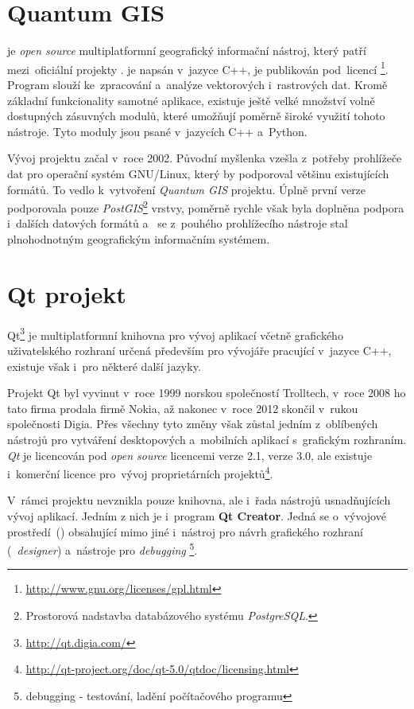 \section{Quantum GIS}
\label{qgis}

 je \textit{open source} multiplatformní geografický 
informační nástroj, který patří mezi~oficiální projekty .
 je napsán v~jazyce C++, je publikován pod~licencí 
\footnote{\url{http://www.gnu.org/licenses/gpl.html}}. 
Program slouží ke~zpracování a~analýze vektorových i~rastrových dat. 
Kromě základní funkcionality samotné aplikace, existuje ještě velké 
množství volně dostupných zásuvných modulů, které umožňují poměrně 
široké využití tohoto nástroje. Tyto moduly jsou psané v~jazycích 
C++ a~Python.

Vývoj projektu  začal v~roce 2002. Původní myšlenka vzešla z~potřeby 
prohlížeče  dat pro operační systém GNU/Linux, který by podporoval většinu 
existujících formátů. To vedlo k~vytvoření \textit{Quantum GIS} projektu. Úplně 
první verze podporovala pouze \textit{PostGIS}\footnote{Prostorová nadstavba 
databázového systému \textit{PostgreSQL}.} vrstvy, poměrně rychle však byla 
doplněna podpora i~dalších datových formátů a~ se z~pouhého prohlížecího 
nástroje stal plnohodnotným geografickým informačním systémem.


\section{Qt projekt}
\label{qt}

Qt\footnote{\url{http://qt.digia.com/}} je multiplatformní knihovna pro 
vývoj aplikací včetně grafického uživatelského rozhraní určená především 
pro vývojáře pracující v~jazyce C++, existuje však i~pro některé další jazyky.

Projekt Qt byl vyvinut v~roce 1999 norskou společností Trolltech, v~roce 
2008 ho tato firma prodala firmě Nokia, až nakonec v~roce 2012 skončil v~rukou
společnosti Digia. Přes všechny tyto změny však zůstal jedním z~oblíbených
nástrojů pro vytváření desktopových a~mobilních aplikací s~grafickým rozhraním.
\textit{Qt} je licencován pod \textit{open source} licencemi  verze 2.1,
 verze 3.0, ale existuje i~komerční licence pro~vývoj proprietárních 
projektů\footnote{\url{http://qt-project.org/doc/qt-5.0/qtdoc/licensing.html}}.

V~rámci projektu nevznikla pouze knihovna, ale i~řada nástrojů usnadňujících
vývoj aplikací. Jedním z nich je i~program \textbf{Qt Creator}. Jedná se o~vývojové 
prostředí~() obsahující mimo jiné i~nástroj pro návrh grafického 
rozhraní (\textit{~designer}) a~nástroje pro \textit{debugging}
\footnote{debugging - testování, ladění počítačového programu}.
